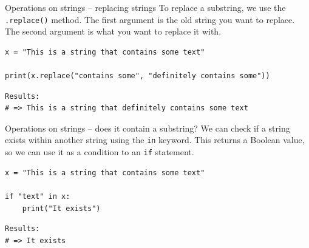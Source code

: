 \documentclass[10pt]{beamer}
\begin{document}
\begin{frame}[label={sec:org78ea3f1},fragile]{Operations on strings -- replacing strings}
 To replace a substring, we use the \texttt{.replace()} method. The first argument is the old
string you want to replace. The second argument is what you want to replace it with.

\begin{verbatim}
x = "This is a string that contains some text"

print(x.replace("contains some", "definitely contains some"))
\end{verbatim}

\begin{verbatim}
Results: 
# => This is a string that definitely contains some text
\end{verbatim}
\end{frame}

\begin{frame}[label={sec:org9e4a892},fragile]{Operations on strings -- does it contain a substring?}
 We can check if a string exists within another string using the \texttt{in} keyword. This
returns a Boolean value, so we can use it as a condition to an \texttt{if} statement.

\begin{verbatim}
x = "This is a string that contains some text"

if "text" in x:
    print("It exists")
\end{verbatim}

\begin{verbatim}
Results: 
# => It exists
\end{verbatim}
\end{frame}
\end{document}
